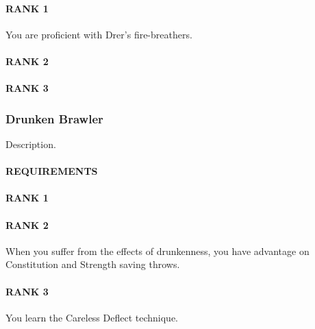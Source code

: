 \paragraph{RANK 1} You are proficient with Drer's fire-breathers.
\paragraph{RANK 2}
\paragraph{RANK 3}

\subsubsection{Drunken Brawler} \label{tal::drunkenbrawler} %
\small{\textcolor{gray}{}}

\normalsize
Description.
\paragraph{REQUIREMENTS}
\paragraph{RANK 1}
\paragraph{RANK 2} When you suffer from the effects of drunkenness, you have advantage on Constitution and Strength saving throws.
\paragraph{RANK 3} You learn the Careless Deflect technique.


